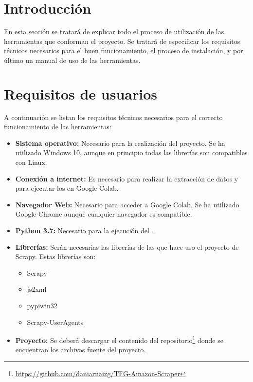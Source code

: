 
\section{Introducción}

En esta sección se tratará de explicar todo el proceso de utilización de las herramientas que conforman el proyecto. Se tratará de especificar los requisitos técnicos necesarios para el buen funcionamiento, el proceso de instalación, y por último un manual de uso de las herramientas.

\section{Requisitos de usuarios}

A continuación se listan los requisitos técnicos necesarios para el correcto funcionamiento de las herramientas:

\begin{itemize}
    \item \textbf{Sistema operativo:} Necesario para la realización del proyecto. Se ha utilizado Windows 10, aunque en principio todas las librerías son compatibles con Linux.
    \item \textbf{Conexión a internet:} Es necesario para realizar la extracción de datos y para ejecutar los   en Google Colab.
    \item \textbf{Navegador Web:} Necesario para acceder a Google Colab. Se ha utilizado Google Chrome aunque cualquier navegador es compatible.
    \item \textbf{Python 3.7:} Necesario para la ejecución del .
    \item \textbf{Librerías:} Serán necesarias las librerías de las que hace uso el proyecto de Scrapy. Estas librerías son:
        \begin{itemize}
            \item Scrapy
            \item js2xml
            \item pypiwin32
            \item Scrapy-UserAgents
        \end{itemize}
    \item \textbf{Proyecto:} Se deberá descargar el contenido del repositorio\footnote{\url{https://github.com/daniarnaizg/TFG-Amazon-Scraper}} donde se encuentran los archivos fuente del proyecto.
\end{itemize}


